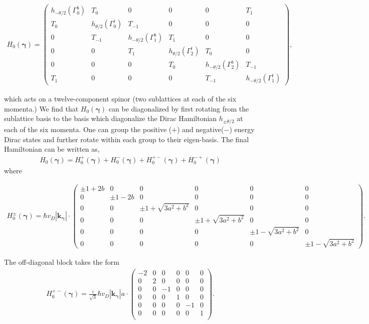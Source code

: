 \documentclass[aps,prl,reprint,amssymb,groupedaddress,twocolumn]{revtex4}
\begin{document}
\begin{widetext}
	\begin{align}
		H_0(\bm{\gamma})=
		\begin{pmatrix}
		h_{-\theta/2}(\Gamma^b_0)  & T_0 &0 & 0&0 & T_{1} \\
		T_0 & h_{\theta/2}(\Gamma^t_0)  & T_{-1} &0 & 0&0 \\
		0 & T_{-1} & h_{-\theta/2}(\Gamma^b_1)  & T_{1} &0 & 0\\
		0 & 0 & T_{1} & h_{\theta/2}(\Gamma^t_2)  & T_{0} &0 \\
		0 & 0 & 0 & T_{0} & h_{-\theta/2}(\Gamma^b_2)  & T_{-1} \\
		T_{1} & 0 & 0 & 0 & T_{-1} & h_{-\theta/2}(\Gamma^t_1)
		\end{pmatrix},
	\end{align}
\end{widetext}
which acts on a twelve-component spinor (two sublattices at each of the six momenta.)
We find that $H_0(\bm{\gamma})$ can be diagonalized by first rotating from the sublattice basis 
to the basis which diagonalize the Dirac Hamiltonian $h_{\pm\theta/2}$ at each of the six momenta.
One can group the positive ($+$) and negative($-$) energy Dirac states and further rotate within each group to their eigen-basis.
The final Hamiltonian can be written as,
\begin{align}
	H_0(\bm{\gamma}) = 	H_0^{+}(\bm{\gamma}) + H_0^{-}(\bm{\gamma}) + H_0^{+-}(\bm{\gamma})+ H_0^{-+}(\bm{\gamma})
\end{align}
where
\begin{widetext}
	\begin{align}
	H_0^{\pm}(\bm{\gamma}) = \hbar v_D |\bm{k}_{\bm{\gamma}}|\cdot
	\begin{pmatrix}
	\pm 1 + 2b & 0 & 0 & 0 & 0 & 0 \\
	0 & \pm 1 - 2b & 0 & 0 & 0 & 0 \\
	0 & 0  & \pm 1 + \sqrt{3a^2+b^2} & 0 & 0 & 0\\
	0 & 0 & 0  & \pm 1 + \sqrt{3a^2+b^2} & 0 & 0 \\
	0 & 0 & 0 & 0  & \pm 1 - \sqrt{3a^2+b^2} & 0 \\
	0 & 0 & 0 & 0 & 0  & \pm 1 - \sqrt{3a^2+b^2} 
	\end{pmatrix}.
 \end{align}
\end{widetext}
The off-diagonal block takes the form
\begin{align}
H_0^{+-}(\bm{\gamma}) =\frac{i}{\sqrt{3}} \hbar v_D |\bm{k}_{\bm{\gamma}}|a \cdot
\begin{pmatrix}
-2 & 0 & 0 & 0 & 0 & 0 \\
0 & 2 & 0 & 0 & 0 & 0 \\
0 & 0 & -1 & 0 & 0 & 0 \\
0 & 0 & 0 & 1 & 0 & 0 \\
0 & 0 & 0 & 0 & -1 & 0 \\
0 & 0 & 0 & 0 & 0 & 1 \\		 	
\end{pmatrix}.
\end{align}
\end{document}
